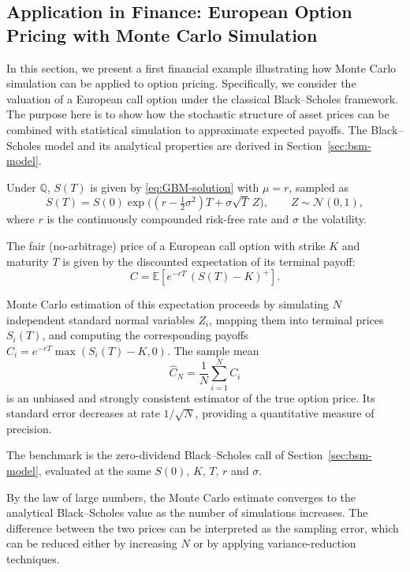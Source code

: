 \subsection{Application in Finance: European Option Pricing with Monte Carlo Simulation}\label{sec:mc-european-call}

In this section, we present a first financial example illustrating how Monte Carlo simulation can be applied to option pricing.  
Specifically, we consider the valuation of a European call option under the classical Black--Scholes framework.  
The purpose here is to show how the stochastic structure of asset prices can be combined with statistical simulation to approximate expected payoffs.  
The Black--Scholes model and its analytical properties are derived in Section~\ref{sec:bsm-model}.

Under $\mathbb Q$, $S(T)$ is given by \eqref{eq:GBM-solution} with $\mu=r$, sampled as
\[
S(T)=S(0)\exp\!\Big((r-\tfrac12\sigma^2)T+\sigma\sqrt{T}\,Z\Big), \qquad Z\sim\mathcal N(0,1),
\]
where $r$ is the continuously compounded risk-free rate and $\sigma$ the volatility.

The fair (no-arbitrage) price of a European call option with strike \(K\) and maturity \(T\) is given by the discounted expectation of its terminal payoff:
\[
C = \mathbb E\!\left[e^{-rT}\,(S(T)-K)^+\right].
\]

Monte Carlo estimation of this expectation proceeds by simulating $N$ independent standard normal variables $Z_i$, mapping them into terminal prices $S_i(T)$, and computing the corresponding payoffs $C_i = e^{-rT}\max(S_i(T) - K, 0)$.  
The sample mean
\[
\widehat C_N = \frac{1}{N}\sum_{i=1}^N C_i
\]
is an unbiased and strongly consistent estimator of the true option price.  
Its standard error decreases at rate \(1/\sqrt{N}\), providing a quantitative measure of precision.  

The benchmark is the zero-dividend Black--Scholes call of Section~\ref{sec:bsm-model}, evaluated at the same $S(0)$, $K$, $T$, $r$ and $\sigma$.



\begin{remark}
By the law of large numbers, the Monte Carlo estimate converges to the analytical Black--Scholes value as the number of simulations increases.  
The difference between the two prices can be interpreted as the sampling error, which can be reduced either by increasing $N$ or by applying variance-reduction techniques.  
\end{remark}

